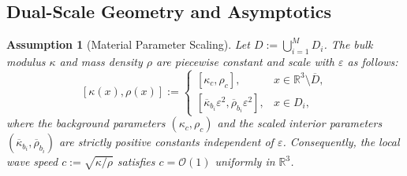 \documentclass[11pt,a4paper]{article}
\numberwithin{equation}{section}
\newtheorem{assumption}{Assumption}
\newcommand{\rankrev}[1]{{\color{rankclarification}#1}}
\begin{document}

\subsection{Dual-Scale Geometry and Asymptotics}\label{secdual}

\begin{assumption}[Material Parameter Scaling]
\label{as111}
Let $D := \bigcup_{i=1}^M D_i$. The bulk modulus $\kappa$ and mass density $\rho$ are piecewise constant and scale with $\varepsilon$ as follows:
\begin{equation}\label{scale}
    [\kappa(x), \rho(x)] := 
    \begin{cases}
        [\kappa_c, \rho_c], & x \in \mathbb{R}^3 \setminus \overline{D}, \\
        [\overline{\kappa}_{b_i} \varepsilon^2, \overline{\rho}_{b_i} \varepsilon^2], & x \in D_i,
    \end{cases}
\end{equation}
where the background parameters $(\kappa_c, \rho_c)$ and the scaled interior parameters $(\overline{\kappa}_{b_i}, \overline{\rho}_{b_i})$ are strictly positive constants independent of $\varepsilon$. Consequently, the local wave speed $c := \sqrt{\kappa/\rho}$ satisfies $c = \mathcal{O}(1)$ uniformly in $\mathbb{R}^3$.
\end{assumption}
\end{document}
